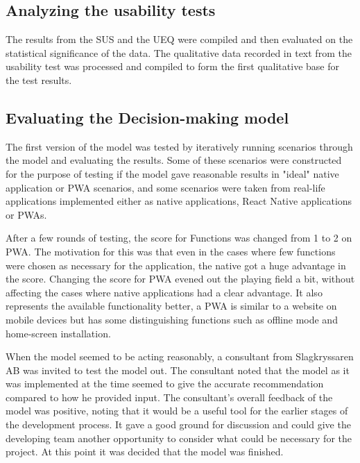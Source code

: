 \subsection{Analyzing the usability tests}

The results from the SUS and the UEQ were compiled and then evaluated on the statistical significance of the data. 
The qualitative data recorded in text from the usability test was processed and compiled to form the first qualitative base for the test results.

\subsection{Evaluating the Decision-making model}

The first version of the model was tested by iteratively running scenarios through the model and evaluating the results. Some of these scenarios were constructed for the purpose of testing if the model gave reasonable results in "ideal" native application or PWA scenarios, and some scenarios were taken from real-life applications implemented either as native applications, React Native applications or PWAs.

After a few rounds of testing, the score for Functions was changed from 1 to 2 on PWA. The motivation for this was that even in the cases where few functions were chosen as necessary for the application, the native got a huge advantage in the score. Changing the score for PWA evened out the playing field a bit, without affecting the cases where native applications had a clear advantage. It also represents the available functionality better, a PWA is similar to a website on mobile devices but has some distinguishing functions such as offline mode and home-screen installation.

When the model seemed to be acting reasonably, a consultant from Slagkryssaren AB was invited to test the model out. The consultant noted that the model as it was implemented at the time seemed to give the accurate recommendation compared to how he provided input. The consultant's overall feedback of the model was positive, noting that it would be a useful tool for the earlier stages of the development process. It gave a good ground for discussion and could give the developing team another opportunity to consider what could be necessary for the project. At this point it was decided that the model was finished.
